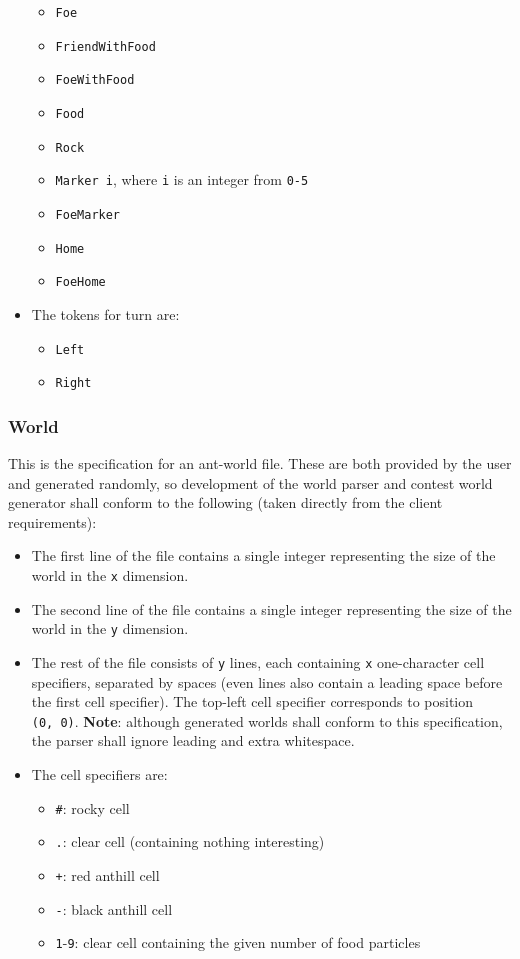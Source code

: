 \documentclass[11pt]{article}
\providecommand{\tightlist}{%
  \setlength{\itemsep}{0pt}\setlength{\parskip}{0pt}}
\begin{document}
\begin{itemize}
\begin{itemize}
\item
  \texttt{Foe}
\item
  \texttt{FriendWithFood}
\item
  \texttt{FoeWithFood}
\item
  \texttt{Food}
\item
  \texttt{Rock}
\item
  \texttt{Marker\ i}, where \texttt{i} is an integer from \texttt{0-5}
\item
  \texttt{FoeMarker}
\item
  \texttt{Home}
\item
  \texttt{FoeHome}
  \end{itemize}
\item
  The tokens for turn are:
    \begin{itemize} \tightlist
\item
  \texttt{Left}
\item
  \texttt{Right}
  \end{itemize}
\end{itemize}

\subsubsection{World}\label{ant-world}

This is the specification for an ant-world file. These are both provided
by the user and generated randomly, so development of the world parser
and contest world generator shall conform to the following (taken
directly from the client requirements):
\begin{itemize}
\tightlist
\item
  The first line of the file contains a single integer representing the
  size of the world in the \texttt{x} dimension.
\item
  The second line of the file contains a single integer representing the
  size of the world in the \texttt{y} dimension.
\item
  The rest of the file consists of \texttt{y} lines, each containing
  \texttt{x} one-character cell specifiers, separated by spaces (even
  lines also contain a leading space before the first cell specifier).
  The top-left cell specifier corresponds to position \texttt{(0,\ 0)}.
  \textbf{Note}: although generated worlds shall conform to this
  specification, the parser shall ignore leading and extra whitespace.
\item
  The cell specifiers are:
  \begin{itemize} \tightlist
\item
  \texttt{\#}: rocky cell
\item
  \texttt{.}: clear cell (containing nothing interesting)
\item
  \texttt{+}: red anthill cell
\item
  \texttt{-}: black anthill cell
\item
  \texttt{1}-\texttt{9}: clear cell containing the given number of food
  particles
  \end{itemize}
\end{itemize}
\end{document}

